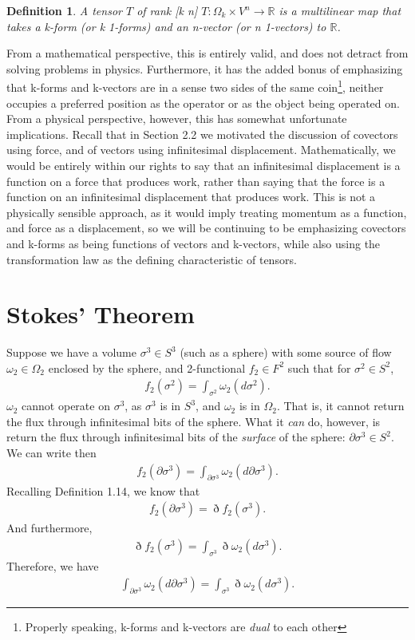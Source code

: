 \documentclass{book}
\newtheorem{defn}[equation]{Definition}
\begin{document}
\begin{defn}
	A tensor $T$ of rank [k n] $T: \Omega_k \times V^n \to \mathbb{R}$ is a multilinear map that takes a k-form (or k 1-forms) and an n-vector (or n 1-vectors) to $\mathbb{R}$. 
\end{defn}

From a mathematical perspective, this is entirely valid, and does not detract from solving problems in physics. Furthermore, it has the added bonus of emphasizing that k-forms and k-vectors are in a sense two sides of the same coin\footnote{Properly speaking, k-forms and k-vectors are \emph{dual} to each other}, neither occupies a preferred position as the operator or as the object being operated on. From a physical perspective, however, this has somewhat unfortunate implications. Recall that in Section 2.2 we motivated the discussion of covectors using force, and of vectors using infinitesimal displacement. Mathematically, we would be entirely within our rights to say that an infinitesimal displacement is a function on a force that produces work, rather than saying that the force is a function on an infinitesimal displacement that produces work. This is not a physically sensible approach, as it would imply treating momentum as a function, and force as a displacement, so we will be continuing to be emphasizing covectors and k-forms as being functions of vectors and k-vectors, while also using the transformation law as the defining characteristic of tensors.

 



\section{Stokes' Theorem}

Suppose we have a volume $\sigma^3 \in S^3$ (such as a sphere) with some source of flow $\omega_2 \in \Omega_2$ enclosed by the sphere, and 2-functional $f_2 \in F^2$ such that for $\sigma^2 \in S^2$, \begin{gather}f_2(\sigma^2) = \int_{\sigma^2} \omega_2(d\sigma^2).\end{gather} $\omega_2$ cannot operate on $\sigma^3$, as $\sigma^3$ is in $S^3$, and $\omega_2$ is in $\Omega_2$. That is, it cannot return the flux through infinitesimal bits of the sphere. What it \emph{can} do, however, is return the flux through infinitesimal bits of the \emph{surface} of the sphere: $\partial \sigma^3 \in S^2$. We can write then \begin{gather}f_2(\partial\sigma^3) = \int_{\partial\sigma^3} \omega_2 (d\partial\sigma^3).\end{gather} Recalling Definition 1.14, we know that \begin{gather}f_2(\partial\sigma^3) = \eth f_2(\sigma^3).\end{gather} And furthermore, \begin{gather}\eth f_2(\sigma^3) = \int_{\sigma^3} \eth\omega_2(d\sigma^3).\end{gather} Therefore, we have \begin{gather}\int_{\partial \sigma^3} \omega_2(d\partial\sigma^3) = \int_{\sigma^3} \eth \omega_2(d\sigma^3).\end{gather}
\end{document}
